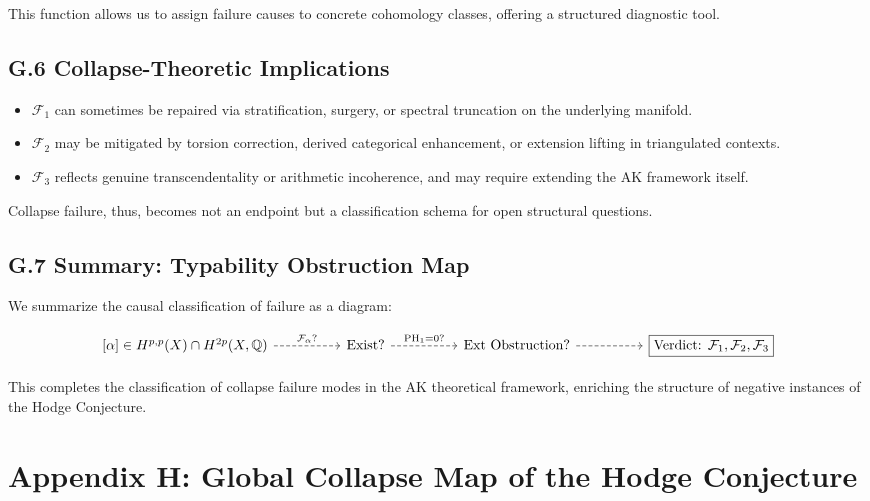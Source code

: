 \documentclass[11pt]{article}
\DeclareMathOperator{\PH}{PH}
\begin{document}
This function allows us to assign failure causes to concrete cohomology classes, offering a structured diagnostic tool.

\subsection*{G.6 Collapse-Theoretic Implications}

\begin{itemize}
  \item $\mathcal{F}_1$ can sometimes be repaired via stratification, surgery, or spectral truncation on the underlying manifold.
  \item $\mathcal{F}_2$ may be mitigated by torsion correction, derived categorical enhancement, or extension lifting in triangulated contexts.
  \item $\mathcal{F}_3$ reflects genuine transcendentality or arithmetic incoherence, and may require extending the AK framework itself.
\end{itemize}

Collapse failure, thus, becomes not an endpoint but a classification schema for open structural questions.

\subsection*{G.7 Summary: Typability Obstruction Map}

We summarize the causal classification of failure as a diagram:

\[
\begin{tikzcd}[row sep=large, column sep=huge]
[\alpha] \in H^{p,p}(X) \cap H^{2p}(X, \mathbb{Q})
\arrow[r, dashed, "\mathcal{F}_\alpha ?"]
& \text{Exist?}
\arrow[r, dashed, "\PH_1 = 0 ?"]
& \text{Ext Obstruction?}
\arrow[r, dashed]
& \boxed{\text{Verdict: }\mathcal{F}_1, \mathcal{F}_2, \mathcal{F}_3}
\end{tikzcd}
\]

This completes the classification of collapse failure modes in the AK theoretical framework, enriching the structure of negative instances of the Hodge Conjecture.




\section*{Appendix H: Global Collapse Map of the Hodge Conjecture}

\end{document}
